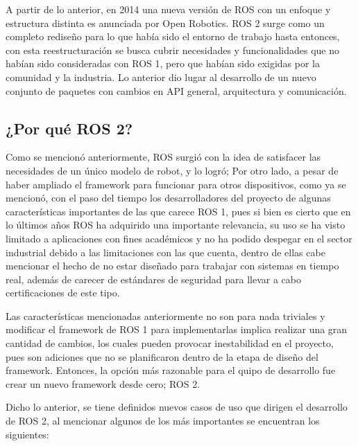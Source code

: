 A partir de lo anterior, en 2014 una nueva versión de ROS con un enfoque y estructura distinta es anunciada por Open Robotics.  ROS 2 surge como un completo rediseño para lo que había sido el entorno de trabajo hasta entonces, con esta reestructuración se busca cubrir necesidades y funcionalidades que no habían sido consideradas con  ROS 1, pero que habían sido exigidas por la comunidad y la industria. Lo anterior dio lugar al desarrollo de un nuevo conjunto de paquetes con cambios en API general, arquitectura y comunicación. 

\subsection{¿Por qué ROS 2?}

Como se mencionó anteriormente, ROS surgió con la idea de satisfacer las necesidades de un único modelo de robot, y lo logró; Por otro lado, a pesar de haber ampliado el framework para funcionar para otros dispositivos, como ya se mencionó, con el paso del tiempo los desarrolladores del proyecto de algunas características importantes de las que carece ROS 1, pues si bien es cierto que en lo últimos años ROS ha adquirido una importante relevancia, su uso se ha visto limitado a aplicaciones con fines académicos y no ha podido despegar en el sector industrial debido a las limitaciones con las que cuenta, dentro de ellas cabe mencionar el hecho de no estar diseñado para trabajar con sistemas en tiempo real, además de carecer de estándares de seguridad para llevar a cabo certificaciones de este tipo. 

Las características mencionadas anteriormente no son para nada triviales y modificar el framework de ROS 1 para implementarlas implica realizar una gran cantidad de cambios, los cuales pueden provocar inestabilidad en el proyecto, pues son adiciones que no se planificaron dentro de la etapa de diseño del framework. Entonces, la opción más razonable para el quipo de desarrollo fue crear un nuevo framework desde cero; ROS 2. 

Dicho lo anterior, se tiene definidos nuevos casos de uso que dirigen el desarrollo de ROS 2, al mencionar algunos de los más importantes se encuentran los siguientes:

